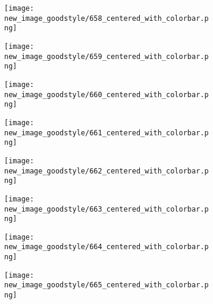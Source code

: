 \documentclass[a4paper,12pt]{article}
\begin{document}
\begin{figure}[H]
  \begin{subfigure}{0.11\textwidth}
    \texttt{[image: new\_image\_goodstyle/658\_centered\_with\_colorbar.png]}
  \end{subfigure}
  \hfill
  \begin{subfigure}{0.11\textwidth}
    \texttt{[image: new\_image\_goodstyle/659\_centered\_with\_colorbar.png]}
  \end{subfigure}
  \hfill
  \begin{subfigure}{0.11\textwidth}
    \texttt{[image: new\_image\_goodstyle/660\_centered\_with\_colorbar.png]}
  \end{subfigure}
  \hfill
  \begin{subfigure}{0.11\textwidth}
    \texttt{[image: new\_image\_goodstyle/661\_centered\_with\_colorbar.png]}
  \end{subfigure}
  \hfill
  \begin{subfigure}{0.11\textwidth}
    \texttt{[image: new\_image\_goodstyle/662\_centered\_with\_colorbar.png]}
  \end{subfigure}
  \hfill
  \begin{subfigure}{0.11\textwidth}
    \texttt{[image: new\_image\_goodstyle/663\_centered\_with\_colorbar.png]}
  \end{subfigure}
  \hfill
  \begin{subfigure}{0.11\textwidth}
    \texttt{[image: new\_image\_goodstyle/664\_centered\_with\_colorbar.png]}
  \end{subfigure}
  \hfill
  \begin{subfigure}{0.11\textwidth}
    \texttt{[image: new\_image\_goodstyle/665\_centered\_with\_colorbar.png]}
  \end{subfigure}
  \hfill
\end{figure}
\end{document}
